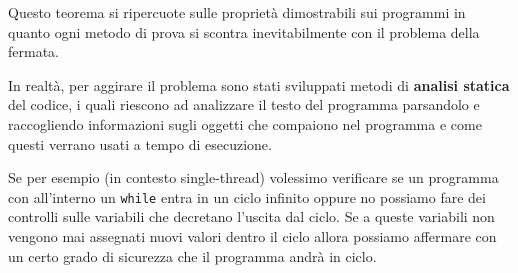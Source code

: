 Questo teorema si ripercuote sulle proprietà dimostrabili sui
programmi in quanto ogni metodo di prova si scontra
inevitabilmente con il problema della fermata.

In realtà, per aggirare il problema sono stati sviluppati metodi
di \textbf{analisi statica} del codice, i quali riescono ad
analizzare il testo del programma parsandolo e raccogliendo
informazioni sugli oggetti che compaiono nel programma e come
questi verrano usati a tempo di esecuzione.

Se per esempio (in contesto single-thread) volessimo verificare
se un programma con all'interno un \verb|while| entra in un
ciclo infinito oppure no possiamo fare dei controlli sulle
variabili che decretano l'uscita dal ciclo. Se a queste variabili
non vengono mai assegnati nuovi valori dentro il ciclo allora
possiamo affermare con un certo grado di sicurezza che il
programma andrà in ciclo.
